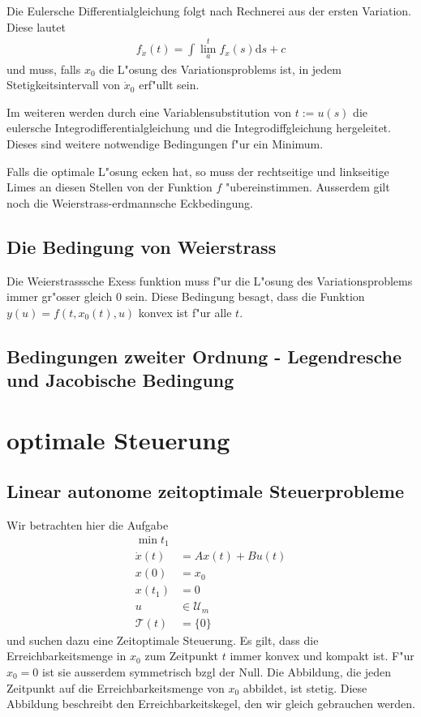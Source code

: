 \documentclass[pdftex,a4paper,oneside]{scrbook}
\begin{document}
Die Eulersche Differentialgleichung folgt nach Rechnerei aus der ersten Variation. Diese lautet
\begin{align*}
	f_{\dot{x}}(t) = \int\lim\limits_{a}^t f_x(s) \mathrm{d} s + c
\end{align*} 
und muss, falls $x_0$ die L"osung des Variationsproblems ist, in jedem Stetigkeitsintervall von $\dot{x}_0$ erf"ullt sein. 

Im weiteren werden durch eine Variablensubstitution von $t:=u(s)$ die eulersche Integrodifferentialgleichung und die Integrodiffgleichung hergeleitet. Dieses sind weitere notwendige Bedingungen f"ur ein Minimum. 

Falls die optimale L"osung ecken hat, so muss der rechtseitige und linkseitige Limes an diesen Stellen von der Funktion $f$ "ubereinstimmen. 
Ausserdem gilt noch die Weierstrass-erdmannsche Eckbedingung. 

\section{Die Bedingung von Weierstrass}

Die Weierstrasssche Exess funktion muss f"ur die L"osung des Variationsproblems immer gr"osser gleich 0 sein.
Diese Bedingung besagt, dass die Funktion $y(u) = f(t,x_0(t), u)$ konvex ist f"ur alle $t$. %

\section{Bedingungen zweiter Ordnung - Legendresche und Jacobische Bedingung} 





\chapter{optimale Steuerung}

\section{Linear autonome zeitoptimale Steuerprobleme}


Wir betrachten hier die Aufgabe
\begin{align*}
	\min t_1 \\
	\dot{x}(t) & = A x(t) + B u(t) \\
	x(0) & = x_0 \\
	x(t_1) & = 0\\
	u & \in \mathcal{U}_m \\
	\mathcal{T}(t) & = \{ 0\}
\end{align*}
und suchen dazu eine Zeitoptimale Steuerung. Es gilt, dass die Erreichbarkeitsmenge in $x_0$ zum Zeitpunkt $t$ immer konvex und kompakt ist. F"ur $x_0=0$ ist sie ausserdem symmetrisch bzgl der Null. Die Abbildung, die jeden Zeitpunkt auf die Erreichbarkeitsmenge von $x_0$ abbildet, ist stetig. Diese Abbildung beschreibt den Erreichbarkeitskegel, den wir gleich gebrauchen werden.  
\end{document}
